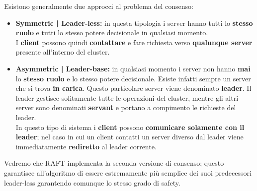 Esistono generalmente due approcci al problema del consenso:
\begin{itemize}
  \item{\textbf{Symmetric | Leader-less:}}
  in questa tipologia i server hanno tutti lo \textbf{stesso ruolo} e tutti lo stesso potere decisionale in qualsiasi momento.\\
  I \textbf{client} possono quindi \textbf{contattare} e fare richiesta verso \textbf{qualunque server} presente all'interno del cluster. 
  \item{\textbf{Asymmetric | Leader-base:}}
  in qualsiasi momento i server non hanno \textbf{mai} lo \textbf{stesso ruolo} e lo stesso potere decisionale. Esiste infatti sempre un server che si trova \textbf{in carica}. Questo particolare server viene denominato \textbf{leader}. Il leader gestisce solitamente tutte le operazioni del cluster, mentre gli altri server sono denominati \textbf{servant} e portano a compimento le richieste del leader.\\
  In questo tipo di sistema i \textbf{client} possono \textbf{comunicare solamente con il leader}; nel caso in cui un client contatti un server diverso dal leader viene immediatamente \textbf{rediretto} al leader corrente.
\end{itemize}
Vedremo che RAFT implementa la seconda versione di consenso; questo garantisce all'algoritmo di essere estremamente più semplice dei suoi predecessori leader-less garantendo comunque lo stesso grado di safety.